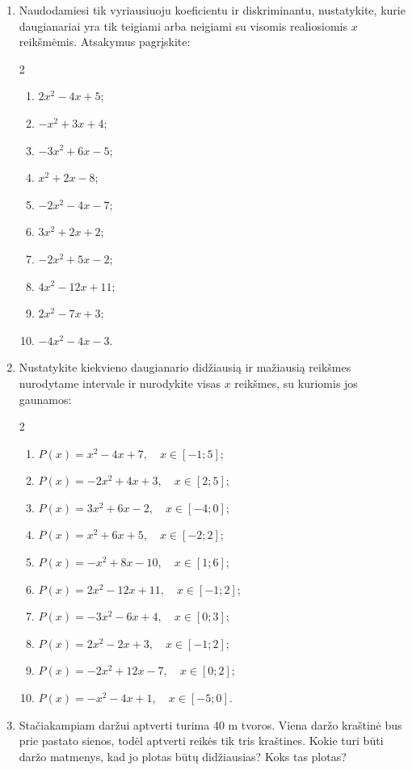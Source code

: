 \documentclass[11pt,a4paper]{article}
\begin{document}
\begin{enumerate}[start=3]
\item Naudodamiesi tik vyriausiuoju koeficientu ir diskriminantu, nustatykite, kurie daugianariai yra tik teigiami arba neigiami su visomis realiosiomis $x$ reikšmėmis. Atsakymus pagrįskite:
\begin{multicols}{2}
\begin{enumerate}[label=(\alph*),leftmargin=1cm,itemsep=0.35em,topsep=0pt]
\item $2x^2-4x+5$;
\item $-x^2+3x+4$;
\item $-3x^2+6x-5$;
\item $x^2+2x-8$;
\item $-2x^2-4x-7$;
\item $3x^2+2x+2$;
\item $-2x^2+5x-2$;
\item $4x^2-12x+11$;
\item $2x^2-7x+3$;
\item $-4x^2-4x-3$.
\end{enumerate}
\end{multicols}
\item Nustatykite kiekvieno daugianario didžiausią ir mažiausią reikšmes nurodytame intervale ir nurodykite visas $x$ reikšmes, su kuriomis jos gaunamos:
\begin{multicols}{2}
\begin{enumerate}[label=(\alph*),leftmargin=1cm,itemsep=0.35em,topsep=0pt]
\item $P(x)=x^2-4x+7,\quad x\in[-1;5]$;
\item $P(x)=-2x^2+4x+3,\quad x\in[2;5]$;
\item $P(x)=3x^2+6x-2,\quad x\in[-4;0]$;
\item $P(x)=x^2+6x+5,\quad x\in[-2;2]$;
\item $P(x)=-x^2+8x-10,\quad x\in[1;6]$;
\item $P(x)=2x^2-12x+11,\quad x\in[-1;2]$;
\item $P(x)=-3x^2-6x+4,\quad x\in[0;3]$;
\item $P(x)=2x^2-2x+3,\quad x\in[-1;2]$;
\item $P(x)=-2x^2+12x-7,\quad x\in[0;2]$;
\item $P(x)=-x^2-4x+1,\quad x\in[-5;0]$.
\end{enumerate}
\end{multicols}
\item \begin{minipage}[t]{\linewidth}Stačiakampiam daržui aptverti turima 40 m tvoros. Viena daržo kraštinė bus prie pastato sienos, todėl aptverti reikės tik tris kraštines. Kokie turi būti daržo matmenys, kad jo plotas būtų didžiausias? Koks tas plotas?\end{minipage}

\end{enumerate}
\end{document}
